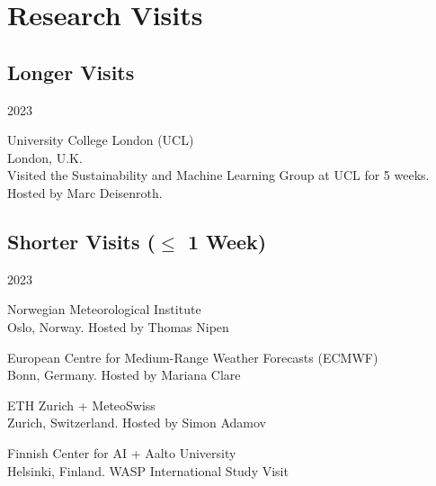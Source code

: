 \section*{Research Visits}
\newcommand{\rvisit}[4]{%
    \item [#2] #1\\
        {\footnotesize#3}\\%
        #4
}\newcommand{\rvisitshort}[4]{%
    \item [#2] #1\\
        {\footnotesize#3. #4}%
}
\subsection*{Longer Visits}
\begin{labeling}{2023}
    \rvisit{University College London (UCL)}{2023}{London, U.K.}{Visited the Sustainability and Machine Learning Group at UCL for 5 weeks. Hosted by Marc Deisenroth.}
\end{labeling}
\subsection*{Shorter Visits ($\leq$ 1 Week)}
\begin{labeling}{2023}
    \rvisitshort{Norwegian Meteorological Institute}{2026}{Oslo, Norway}{Hosted by Thomas Nipen}
    \rvisitshort{European Centre for Medium-Range Weather Forecasts (ECMWF)}{2024}{Bonn, Germany}{Hosted by Mariana Clare}
    \rvisitshort{ETH Zurich + MeteoSwiss}{2024}{Zurich, Switzerland}{Hosted by Simon Adamov}
    \rvisitshort{Finnish Center for AI + Aalto University}{2022}{Helsinki, Finland}{WASP International Study Visit}
\end{labeling}
